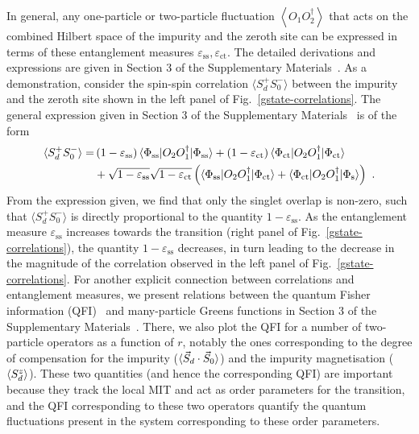 \documentclass{iopart}
\begin{document}
In general, any one-particle or two-particle fluctuation \(\left<O_1 O_2^\dagger \right>\) that acts on the combined Hilbert space of the impurity and the zeroth site can be expressed in terms of these entanglement measures \(\varepsilon_\text{ss},\varepsilon_\text{ct}\). The detailed derivations and expressions are given in Section 3 of the Supplementary Materials~\cite{supp_mat}. As a demonstration, consider the spin-spin correlation $\langle S_{d}^{+}S_{0}^{-}\rangle$ between the impurity and the zeroth site shown in the left panel of Fig.~\eqref{gstate-correlations}. The general expression given in Section 3 of the Supplementary Materials~\cite{supp_mat} is of the form
\begin{eqnarray}
	\langle S_{d}^{+}S_{0}^{-}\rangle =& \left(1 - \varepsilon_\text{ss}\right) \braket{\Phi_\text{ss} | O_2 O_1^\dagger | \Phi_\text{ss}} + \left(1 - \varepsilon_\text{ct}\right) \braket{\Phi_\text{ct} | O_2 O_1^\dagger | \Phi_\text{ct}} \nonumber \\
				      &+ \sqrt{1 - \varepsilon_\text{ss}}\sqrt{1 - \varepsilon_\text{ct}}\left(\braket{\Phi_\text{ss} | O_2 O_1^\dagger | \Phi_\text{ct}} + \braket{\Phi_\text{ct} | O_2 O_1^\dagger | \Phi_\text{s}}\right)~.
\end{eqnarray}
From the expression given, we find that only the singlet overlap is non-zero, such that $\langle S_{d}^{+}S_{0}^{-}\rangle$ is directly proportional to the quantity \(1-\varepsilon_\text{ss}\). As the entanglement measure \(\varepsilon_\text{ss}\) increases towards the transition (right panel of Fig.~\eqref{gstate-correlations}), the quantity \(1 - \varepsilon_\text{ss}\) decreases, in turn leading to the decrease in the magnitude of the correlation observed in the left panel of Fig.~\eqref{gstate-correlations}. For another explicit connection between correlations and entanglement measures, we present relations between the quantum Fisher information (QFI)~\cite{Hauke2016} and many-particle Greens functions in Section 3 of the Supplementary Materials~\cite{supp_mat}. There, we also plot the QFI for a number of two-particle operators as a function of \(r\), notably the ones corresponding to the degree of compensation for the impurity (\(\braket{\vec{S}_d\cdot\vec{S}_0}\)) and the impurity magnetisation (\(\braket{S_d^z}\)).
These two quantities (and hence the corresponding QFI) are important because they track the local MIT and act as order parameters for the transition, and the QFI corresponding to these two operators quantify the quantum fluctuations present in the system corresponding to these order parameters.
\end{document}
